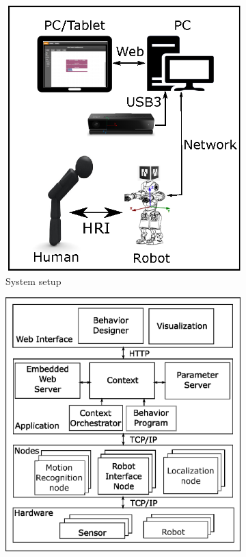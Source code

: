 \begin{figure}
\centering
\begin{subfigure}[t]{0.48\textwidth}
\includegraphics[width=\textwidth]{../thesis/assets/system_setup.eps}
\caption[System setup]{System setup}
\label{fig:localize_frames}
\end{subfigure}
\begin{subfigure}[t]{0.48\textwidth}
\includegraphics[width=\textwidth]{../thesis/assets/architecture.eps}

\end{subfigure}
\end{figure}
